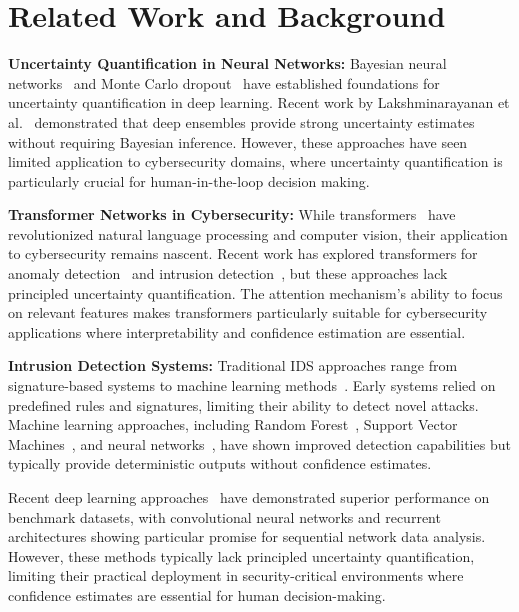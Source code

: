\documentclass[journal]{IEEEtran}
\begin{document}
\section{Related Work and Background}

\textbf{Uncertainty Quantification in Neural Networks:} Bayesian neural networks~\cite{mackay1992practical} and Monte Carlo dropout~\cite{gal2016dropout} have established foundations for uncertainty quantification in deep learning. Recent work by Lakshminarayanan et al.~\cite{lakshminarayanan2017simple} demonstrated that deep ensembles provide strong uncertainty estimates without requiring Bayesian inference. However, these approaches have seen limited application to cybersecurity domains, where uncertainty quantification is particularly crucial for human-in-the-loop decision making.

\textbf{Transformer Networks in Cybersecurity:} While transformers~\cite{vaswani2017attention} have revolutionized natural language processing and computer vision, their application to cybersecurity remains nascent. Recent work has explored transformers for anomaly detection~\cite{audibert2020usad} and intrusion detection~\cite{tian2021tranad}, but these approaches lack principled uncertainty quantification. The attention mechanism's ability to focus on relevant features makes transformers particularly suitable for cybersecurity applications where interpretability and confidence estimation are essential.

\textbf{Intrusion Detection Systems:} Traditional IDS approaches range from signature-based systems to machine learning methods~\cite{buczak2016survey}. Early systems relied on predefined rules and signatures, limiting their ability to detect novel attacks. Machine learning approaches, including Random Forest~\cite{breiman2001random}, Support Vector Machines~\cite{mukkamala2002intrusion}, and neural networks~\cite{cannady1998artificial}, have shown improved detection capabilities but typically provide deterministic outputs without confidence estimates.

Recent deep learning approaches~\cite{vinayakumar2017deep} have demonstrated superior performance on benchmark datasets, with convolutional neural networks and recurrent architectures showing particular promise for sequential network data analysis. However, these methods typically lack principled uncertainty quantification, limiting their practical deployment in security-critical environments where confidence estimates are essential for human decision-making.
\end{document}
